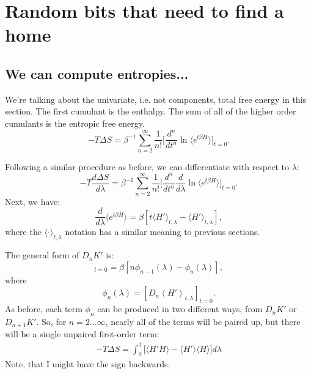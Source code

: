 \documentclass{article}
\begin{document}
\clearpage

\section*{Random bits that need to find a home}
\subsection*{We can compute entropies...}

We're talking about the univariate, i.e. not components, total free energy in this section. The first cumulant is the enthalpy. The sum of all of the higher order cumulants is the entropic free energy.
\begin{equation}
-T \Delta S = \beta^{-1} \sum_{n=2}^\infty \frac{1}{n!}
	\Bigg[ 
		\frac{d^n}{dt^n}
		\ln \langle e^{t\beta H} \rangle
	\Bigg]_{t=0}.
\end{equation}

Following a similar procedure as before, we can differentiate with respect to $\lambda$:
\begin{equation}
-T\frac{d\Delta S}{d\lambda} = \beta^{-1} \sum_{n=2}^\infty \frac{1}{n!}
	\Bigg[ 
		\frac{d^n}{dt^n}
		\frac{d}{d\lambda} \ln \langle e^{t \beta H} \rangle
	\Bigg]_{t=0}.
\end{equation}
Next, we have:
\begin{equation}
\frac{d}{d\lambda} \langle e^{t \beta H} \rangle =
\beta \left[
	t \langle H' \rangle_{t, \lambda} - \langle H' \rangle_{t, \lambda}
\right],
\end{equation}
where the $\langle \cdot \rangle_{t,\lambda}$ notation has a similar meaning to previous sections.

The general form of $D_n K'$ is:
\begin{equation}
[D_n K_\lambda']_{t=0} =
	\beta\left[
		n \phi_{n-1}(\lambda) -
    	\phi_n(\lambda)
    \right],
\end{equation}
where
\begin{equation}
\phi_n(\lambda) =
	\left[ D_n \left\langle
    	H'
    \right\rangle_{t, \lambda} \right]_{t=0}.
\end{equation}
As before, each term $\phi_n$ can be produced in two different ways, from $D_n K'$ or $D_{n+1} K'$. So, for $n=2\ldots\infty$, nearly all of the terms will be paired up, but there will be a single unpaired first-order term:
\begin{align}
-T \Delta S = \int_0^1
	\Bigg[ 
		\langle H' H \rangle - \langle H' \rangle \langle H \rangle
	\Bigg] d\lambda
\end{align}
Note, that I might have the sign backwards.
\end{document}
